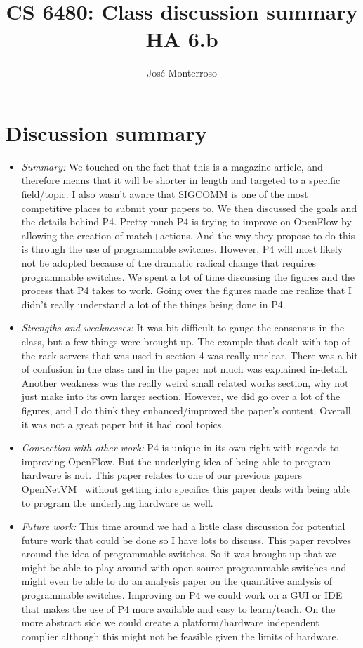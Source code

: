 \documentclass[letterpaper,twocolumn,10pt]{article}
\title{CS 6480: Class discussion summary\\
HA 6.b\\}
\author{José Monterroso}
\affil{School of Computing, University of Utah}
\begin{document}
\maketitle
\section*{Discussion summary}

\begin{itemize}

\item {\it Summary:} 
We touched on the fact that this is a magazine article, and therefore means that it will be shorter in length
and targeted to a specific field/topic. I also wasn't aware that SIGCOMM is one of the most competitive 
places to submit your papers to. We then discussed the goals and the details behind P4. Pretty much P4
is trying to improve on OpenFlow by allowing the creation of match+actions. And the way they propose to 
do this is through the use of programmable switches. However, P4 will most likely not be adopted because 
of the dramatic radical change that requires programmable switches. We spent a lot of time discussing the 
figures and the process that P4 takes to work. Going over the figures made me realize that I didn't really
understand a lot of the things being done in P4. 

\item {\it Strengths and weaknesses:} 
It was bit difficult to gauge the consensus in the class, but a few things were brought up. The 
example that dealt with top of the rack servers that was used in section 4 was really unclear. There was a bit of confusion 
in the class and in the paper not much was explained in-detail. Another weakness was the really weird small
related works section, why not just make into its own larger section. However, we did go over a lot of the
figures, and I do think they enhanced/improved the paper's content. Overall it was not a great paper but it had cool 
topics. 

\item {\it Connection with other work:} 
P4 is unique in its own right with regards to improving OpenFlow. But the underlying idea of being
able to program hardware is not. This paper relates to one of our previous papers OpenNetVM~\cite{opennetvm}
without getting into specifics this paper deals with being able to program the underlying hardware as well.

\item {\it Future work:} 
This time around we had a little class discussion for potential future work that could be done so I 
have lots to discuss. This paper revolves around the idea of programmable switches. So it was brought up
that we might be able to play around with open source programmable switches and might even be able
to do an analysis paper on the quantitive analysis of programmable switches. Improving on P4 we could
work on a GUI or IDE that makes the use of P4 more available and easy to learn/teach. On the more 
abstract side we could create a platform/hardware independent complier although this might not be 
feasible given the limits of hardware. 

\end{itemize}


{
  \small 
  
  
}
\end{document}
